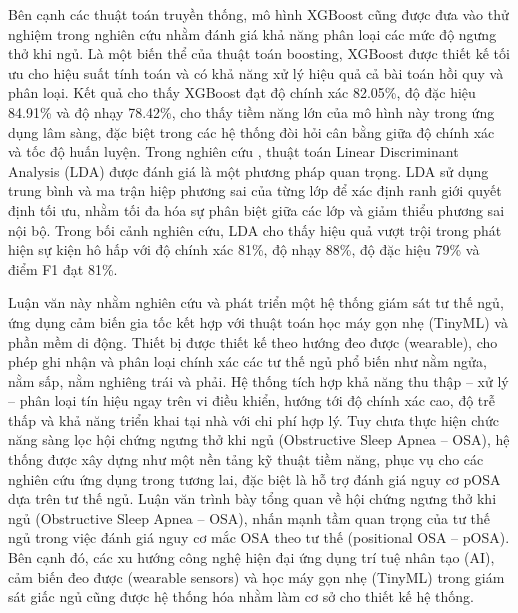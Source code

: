 Bên cạnh các thuật toán truyền thống, mô hình XGBoost \cite{chen2016xgboost} cũng được đưa vào thử nghiệm trong nghiên cứu \cite{wang2023ml_wearable}
nhằm đánh giá khả năng phân loại các mức độ ngưng thở khi ngủ. 
Là một biến thể của thuật toán boosting, XGBoost được thiết kế tối ưu cho hiệu suất tính toán 
và có khả năng xử lý hiệu quả cả bài toán hồi quy và phân loại. 
Kết quả cho thấy XGBoost đạt độ chính xác 82.05\%, độ đặc hiệu 84.91\% và độ nhạy 78.42\%, 
cho thấy tiềm năng lớn của mô hình này trong ứng dụng lâm sàng, 
đặc biệt trong các hệ thống đòi hỏi cân bằng giữa độ chính xác và tốc độ huấn luyện.
Trong nghiên cứu \cite{yeo2022respiratory}, 
thuật toán Linear Discriminant Analysis (LDA) \cite{tharwat2017lda} được đánh giá là một phương pháp quan trọng. 
LDA sử dụng trung bình và ma trận hiệp phương sai của từng lớp để xác định ranh giới quyết định tối ưu, 
nhằm tối đa hóa sự phân biệt giữa các lớp và giảm thiểu phương sai nội bộ. 
Trong bối cảnh nghiên cứu, LDA cho thấy hiệu quả vượt trội trong phát hiện sự kiện hô hấp với độ chính xác 
81\%, độ nhạy 88\%, độ đặc hiệu 79\% và điểm F1 đạt 81\%.




Luận văn này nhằm nghiên cứu và phát triển một hệ thống 
giám sát tư thế ngủ, ứng dụng cảm biến gia tốc kết hợp 
với thuật toán học máy gọn nhẹ (TinyML) và phần mềm di động. 
Thiết bị được thiết kế theo hướng đeo được (wearable), 
cho phép ghi nhận và phân loại chính xác các tư thế 
ngủ phổ biến như nằm ngửa, nằm sấp, nằm nghiêng trái và phải. 
Hệ thống tích hợp khả năng thu thập – xử lý – phân loại tín 
hiệu ngay trên vi điều khiển, hướng tới độ chính xác cao, 
độ trễ thấp và khả năng triển khai tại nhà với chi phí hợp lý. 
Tuy chưa thực hiện chức năng sàng lọc hội chứng ngưng thở khi ngủ (Obstructive Sleep Apnea – OSA), 
hệ thống được xây dựng như một nền tảng kỹ thuật tiềm năng, phục vụ cho các nghiên cứu ứng dụng trong tương lai, 
đặc biệt là hỗ trợ đánh giá nguy cơ pOSA dựa trên tư thế ngủ.
Luận văn trình bày tổng quan về hội chứng ngưng thở khi ngủ (Obstructive Sleep Apnea – OSA), 
nhấn mạnh tầm quan trọng của tư thế ngủ trong việc đánh giá nguy cơ mắc OSA theo tư thế (positional OSA – pOSA). 
Bên cạnh đó, các xu hướng công nghệ hiện đại ứng dụng trí tuệ nhân tạo (AI), 
cảm biến đeo được (wearable sensors) và học máy gọn nhẹ (TinyML) 
trong giám sát giấc ngủ cũng được hệ thống hóa nhằm làm 
cơ sở cho thiết kế hệ thống.

